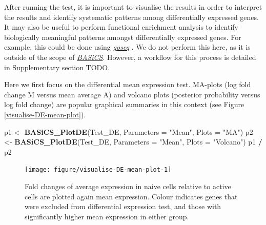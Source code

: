 \documentclass[9pt,a4paper,]{extarticle}
\newenvironment{Shaded}{\begin{snugshade}}{\end{snugshade}}
\newcommand{\CommentTok}[1]{\textcolor[rgb]{0.56,0.35,0.01}{\textit{#1}}}
\newcommand{\DataTypeTok}[1]{\textcolor[rgb]{0.13,0.29,0.53}{#1}}
\newcommand{\KeywordTok}[1]{\textcolor[rgb]{0.13,0.29,0.53}{\textbf{#1}}}
\newcommand{\NormalTok}[1]{#1}
\newcommand{\OperatorTok}[1]{\textcolor[rgb]{0.81,0.36,0.00}{\textbf{#1}}}
\newcommand{\StringTok}[1]{\textcolor[rgb]{0.31,0.60,0.02}{#1}}
\begin{document}
After running the test, it is important to visualise the results in order to
interpret the results and identify systematic patterns among differentially
expressed genes.
It may also be useful to perform functional enrichment analysis to identify
biologically meaningful patterns amongst differentially expressed genes.
For example, this could be done using \emph{\href{https://bioconductor.org/packages/3.11/goseq}{goseq}} \citep{Young2010}.
We do not perform this here, as it is outside of the scope of
\emph{\href{https://bioconductor.org/packages/3.11/BASiCS}{BASiCS}}.
However, a workflow for this process is detailed in Supplementary section TODO.

Here we first focus on the differential mean expression test.
MA-plots (log fold change M versus mean average A) and volcano plots (posterior
probability versus log fold change) are popular graphical summaries in this
context (see Figure \ref{visualise-DE-mean-plot}).

\begin{Shaded}
\begin{Highlighting}[]
\NormalTok{p1 <-}\StringTok{ }\KeywordTok{BASiCS_PlotDE}\NormalTok{(Test_DE, }\DataTypeTok{Parameters =} \StringTok{"Mean"}\NormalTok{, }\DataTypeTok{Plots =} \StringTok{"MA"}\NormalTok{) }
\NormalTok{p2 <-}\StringTok{ }\KeywordTok{BASiCS_PlotDE}\NormalTok{(Test_DE, }\DataTypeTok{Parameters =} \StringTok{"Mean"}\NormalTok{, }\DataTypeTok{Plots =} \StringTok{"Volcano"}\NormalTok{) }
\NormalTok{p1 }\OperatorTok{/}\StringTok{ }\NormalTok{p2}
\end{Highlighting}
\end{Shaded}

\begin{figure}

{\centering \texttt{[image: figure/visualise-DE-mean-plot-1]} 

}

\caption{Fold changes of average expression in naive cells relative to active cells are plotted again mean expression. Colour indicates genes that were excluded from differential expression test, and those with significantly higher mean expression in either group.}\label{fig:visualise-DE-mean-plot}
\end{figure}

\begin{Shaded}
\end{Shaded}
\end{document}
